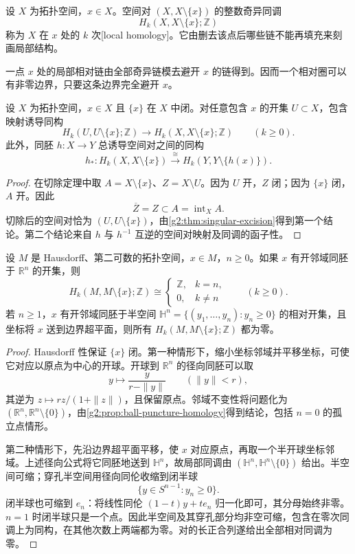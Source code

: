 \begin{definition}[一点处的局部同调]\label{g2:def:local-homology}
	设 \(X\) 为拓扑空间，\(x\in X\)。空间对 \((X,X\setminus\{x\})\) 的整数奇异同调
	\[
		H_k(X,X\setminus\{x\};\mathbb Z)
	\]
	称为 \(X\) 在 \(x\) 处的 \(k\) 次[local homology]。它由删去该点后哪些链不能再填充来刻画局部结构。
\end{definition}

一点 \(x\) 处的局部相对链由全部奇异链模去避开 \(x\) 的链得到。因而一个相对圈可以有非零边界，只要这条边界完全避开 \(x\)。

\begin{proposition}\label{g2:prop:local-homology-neighborhood}
	设 \(X\) 为拓扑空间，\(x\in X\) 且 \(\{x\}\) 在 \(X\) 中闭。对任意包含 \(x\) 的开集 \(U\subset X\)，包含映射诱导同构
	\[
		H_k(U,U\setminus\{x\};\mathbb Z)
		\longrightarrow H_k(X,X\setminus\{x\};\mathbb Z)
		\qquad(k\ge0).
	\]
	此外，同胚 \(h:X\to Y\) 总诱导空间对之间的同构
	\[
		h_*:H_k(X,X\setminus\{x\})\xrightarrow{\cong}
		H_k(Y,Y\setminus\{h(x)\}).
	\]
\end{proposition}
\begin{proof}
	在切除定理中取 \(A=X\setminus\{x\}\)、\(Z=X\setminus U\)。因为 \(U\) 开，\(Z\) 闭；因为 \(\{x\}\) 闭，\(A\) 开。因此
	\[
		\overline Z=Z\subset A=\operatorname{int}_X A.
	\]
	切除后的空间对恰为 \((U,U\setminus\{x\})\)，由\cref{g2:thm:singular-excision}得到第一个结论。第二个结论来自 \(h\) 与 \(h^{-1}\) 互逆的空间对映射及同调的函子性。
\end{proof}

\begin{theorem}\label{g2:thm:manifold-local-homology}
	设 \(M\) 是 Hausdorff、第二可数的拓扑空间，\(x\in M\)，\(n\ge0\)。如果 \(x\) 有开邻域同胚于 \(\mathbb R^n\) 的开集，则
	\[
		H_k(M,M\setminus\{x\};\mathbb Z)
		\cong
		\begin{cases}\mathbb Z,&k=n,\\0,&k\ne n\end{cases}
		\qquad(k\ge0).
	\]
	若 \(n\ge1\)，\(x\) 有开邻域同胚于半空间
	\(\mathbb H^n=\{(y_1,\ldots,y_n):y_n\ge0\}\) 的相对开集，且坐标将 \(x\) 送到边界超平面，则所有 \(H_k(M,M\setminus\{x\};\mathbb Z)\) 都为零。
\end{theorem}
\begin{proof}
	Hausdorff 性保证 \(\{x\}\) 闭。第一种情形下，缩小坐标邻域并平移坐标，可使它对应以原点为中心的开球。开球到 \(\mathbb R^n\) 的径向同胚可以取
	\[
		y\longmapsto\frac{y}{r-\|y\|}\qquad(\|y\|<r),
	\]
	其逆为 \(z\mapsto rz/(1+\|z\|)\)，且保留原点。邻域不变性将问题化为 \((\mathbb R^n,\mathbb R^n\setminus\{0\})\)，由\cref{g2:prop:ball-puncture-homology}得到结论，包括 \(n=0\) 的孤立点情形。

	第二种情形下，先沿边界超平面平移，使 \(x\) 对应原点，再取一个半开球坐标邻域。上述径向公式将它同胚地送到 \(\mathbb H^n\)，故局部同调由 \((\mathbb H^n,\mathbb H^n\setminus\{0\})\) 给出。半空间可缩；穿孔半空间用径向同伦收缩到闭半球
	\[
		\{y\in S^{n-1}:y_n\ge0\}.
	\]
	闭半球也可缩到 \(e_n\)：将线性同伦 \((1-t)y+te_n\) 归一化即可，其分母始终非零。\(n=1\) 时闭半球只是一个点。因此半空间及其穿孔部分均非空可缩，包含在零次同调上为同构，在其他次数上两端都为零。对的长正合列遂给出全部相对同调为零。
\end{proof}

